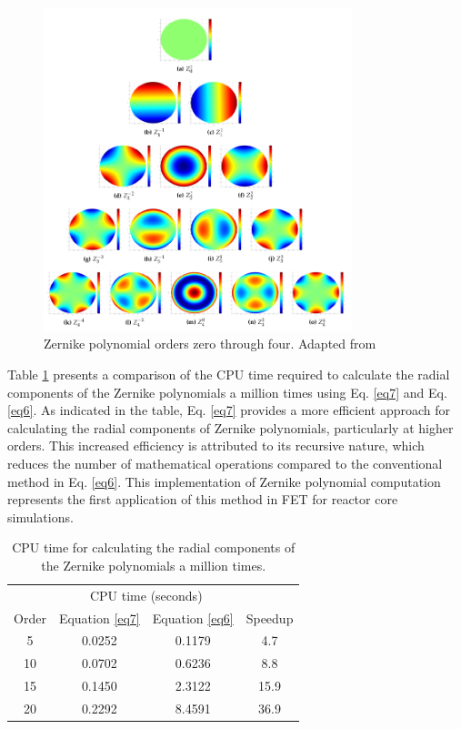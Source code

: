 \begin{figure}
    \centering
    \includegraphics[width=0.8\textwidth]{figs/zernike.png}
    \caption[Zernike polynomial orders zero through four]{Zernike polynomial orders zero through four. Adapted from \cite{ellis}}
    \label{fig_21}
\end{figure}

Table \ref{tab_z} presents a comparison of the CPU time required to calculate the radial components of the Zernike polynomials a million times using Eq. \ref{eq7} and Eq. \ref{eq6}. As indicated in the table, Eq. \ref{eq7} provides a more efficient approach for calculating the radial components of Zernike polynomials, particularly at higher orders. This increased efficiency is attributed to its recursive nature, which reduces the number of mathematical operations compared to the conventional method in Eq. \ref{eq6}. This implementation of Zernike polynomial computation represents the first application of this method in FET for reactor core simulations.

\begin{table}
    \centering
    \caption[CPU time for calculating the radial components of the Zernike polynomials]{CPU time for calculating the radial components of the Zernike polynomials a million times.}
    \label{tab_z} 
    \begin{tabular}{| c | c | c | c | }
    \hline
           & \multicolumn{2}{c|}{CPU time (seconds)} &        \\
    \cline{2-3}
     Order & Equation \ref{eq7} & Equation \ref{eq6} & Speedup \\
     \hline
     5    & 0.0252  & 0.1179 & 4.7      \\ \hline
     10   & 0.0702  & 0.6236 & 8.8      \\ \hline
     15   & 0.1450  & 2.3122 & 15.9     \\ \hline
     20   & 0.2292  & 8.4591 & 36.9     \\ \hline
    \end{tabular}
\end{table}

